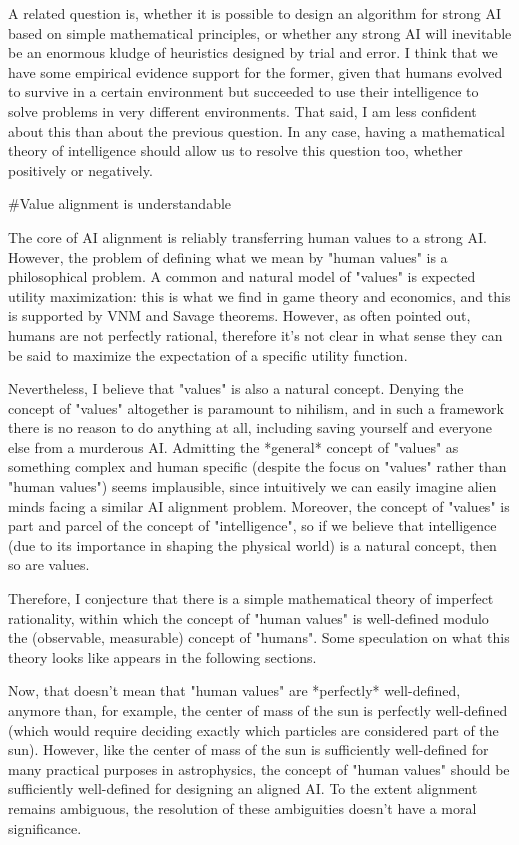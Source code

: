 \documentclass[a4paper]{article}
\begin{document}
A related question is, whether it is possible to design an algorithm for strong AI based on simple mathematical principles, or whether any strong AI will inevitable be an enormous kludge of heuristics designed by trial and error. I think that we have some empirical evidence support for the former, given that humans evolved to survive in a certain environment but succeeded to use their intelligence to solve problems in very different environments. That said, I am less confident about this than about the previous question. In any case, having a mathematical theory of intelligence should allow us to resolve this question too, whether positively or negatively.

\#Value alignment is understandable

The core of AI alignment is reliably transferring human values to a strong AI. However, the problem of defining what we mean by "human values" is a philosophical problem. A common and natural model of "values" is expected utility maximization: this is what we find in game theory and economics, and this is supported by VNM and Savage theorems. However, as often pointed out, humans are not perfectly rational, therefore it's not clear in what sense they can be said to maximize the expectation of a specific utility function.

Nevertheless, I believe that "values" is also a natural concept. Denying the concept of "values" altogether is paramount to nihilism, and in such a framework there is no reason to do anything at all, including saving yourself and everyone else from a murderous AI. Admitting the *general* concept of "values" as something complex and human specific (despite the focus on "values" rather than "human values") seems implausible, since intuitively we can easily imagine alien minds facing a similar AI alignment problem. Moreover, the concept of "values" is part and parcel of the concept of "intelligence", so if we believe that intelligence (due to its importance in shaping the physical world) is a natural concept, then so are values.

Therefore, I conjecture that there is a simple mathematical theory of imperfect rationality, within which the concept of "human values" is well-defined modulo the (observable, measurable) concept of "humans". Some speculation on what this theory looks like appears in the following sections.

Now, that doesn't mean that "human values" are *perfectly* well-defined, anymore than, for example, the center of mass of the sun is perfectly well-defined (which would require deciding exactly which particles are considered part of the sun). However, like the center of mass of the sun is sufficiently well-defined for many practical purposes in astrophysics, the concept of "human values" should be sufficiently well-defined for designing an aligned AI. To the extent alignment remains ambiguous, the resolution of these ambiguities doesn't have a moral significance.
\end{document}
